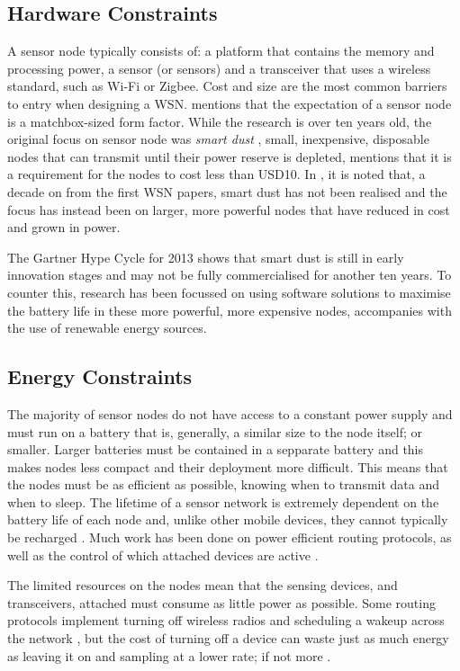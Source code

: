 \subsection{Hardware Constraints}
	A sensor node typically consists of: a platform that contains the memory and processing power,  a sensor (or sensors) and a transceiver that uses a wireless standard, such as Wi-Fi or Zigbee. Cost and size are the most common barriers to entry when designing a WSN. \cite{Intanagonwiwat2000} mentions that the expectation of a sensor node is a matchbox-sized form factor. While the research is over ten years old, the original focus on sensor node was \textit{smart dust} \cite{Kahn}, small, inexpensive, disposable nodes that can transmit until their power reserve is depleted, \cite{Akyildiz2002a} mentions that it is a requirement for the nodes to cost less than USD10. In \cite{Corke2010a}, it is noted that, a decade on from the first WSN papers, smart dust has not been realised and the focus has instead been on larger, more powerful nodes that have reduced in cost and grown in power. 

	The Gartner Hype Cycle for 2013 \cite{gartner2013} shows that smart dust is still in early innovation stages and may not be fully commercialised for another ten years. To counter this, research has been focussed on using software solutions to maximise the battery life in these more powerful, more expensive nodes, accompanies with the use of renewable energy sources.

\subsection{Energy Constraints}
	 The majority of sensor nodes do not have access to a constant power supply and must run on a battery that is, generally, a similar size to the node itself; or smaller. Larger batteries must be contained in a sepparate battery and this makes nodes less compact and their deployment more difficult. This means that the nodes must be as efficient as possible, knowing when to transmit data and when to sleep. The lifetime of a sensor network is extremely dependent on the battery life of each node and, unlike other mobile devices, they cannot typically be recharged \cite{Akyildiz2002}. Much work has been done on power efficient routing protocols, as well as the control of which attached devices are active \cite{Segal2010a, Hempstead2005, Schurgers}. 

	The limited resources on the nodes mean that the sensing devices, and transceivers, attached must consume as little power as possible. Some routing protocols implement turning off wireless radios and scheduling a wakeup across the network \cite{Vaidya2004}, but the cost of turning off a device can waste just as much energy as leaving it on and sampling at a lower rate; if not more \cite{Estrin2001}.

